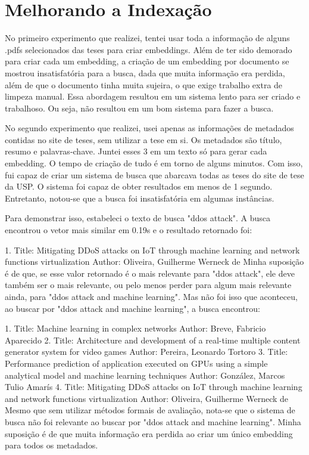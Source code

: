 \documentclass[
	12pt,				%
	openright,			%
	oneside,			%
	a4paper,			%
	english,			%
	french,				%
	spanish,			%
	brazil				%
	]{abntex2}
\begin{document}
\section{Melhorando a Indexação}
No primeiro experimento que realizei, tentei usar toda a informação de alguns .pdfs selecionados das teses para criar
embeddings.
Além de ter sido demorado para criar cada um embedding, a criação de um embedding por documento se mostrou insatisfatória
para a busca, dada que muita informação era perdida, além de que o documento tinha muita sujeira, o que exige trabalho
extra de limpeza manual.
Essa abordagem resultou em um sistema lento para ser criado e trabalhoso.
Ou seja, não resultou em um bom sistema para fazer a busca.

No segundo experimento que realizei, usei apenas as informações de metadados contidas no site de teses, sem utilizar a tese em si. Os metadados são título, resumo e palavras-chave. Juntei esses 3 em um texto só para gerar cada embedding. O tempo de criação de tudo é em torno de alguns minutos. Com isso, fui capaz de criar um sistema de busca que abarcava todas as teses do site de tese da USP. O sistema foi capaz de obter resultados em menos de 1 segundo. Entretanto, notou-se que a busca foi insatisfatória em algumas instâncias.

Para demonstrar isso, estabeleci o texto de busca "ddos attack". A busca encontrou o vetor mais similar em 0.19s e o resultado retornado foi:

1. Title:  Mitigating DDoS attacks on IoT through machine learning and network functions virtualization
Author:  Oliveira, Guilherme Werneck de
Minha suposição é de que, se esse valor retornado é o mais relevante para "ddos attack", ele deve também ser o mais relevante, ou pelo menos perder para algum mais relevante ainda, para "ddos attack and machine learning". Mas não foi isso que aconteceu, ao buscar por "ddos attack and machine learning", a busca encontrou:

1. Title:  Machine learning in complex networks
Author:  Breve, Fabricio Aparecido
2. Title:  Architecture and development of a real-time multiple content generator system for video games
Author:  Pereira, Leonardo Tortoro
3. Title:  Performance prediction of application executed on GPUs using a simple analytical model and machine learning techniques
Author:  González, Marcos Tulio Amarís
4. Title:  Mitigating DDoS attacks on IoT through machine learning and network functions virtualization
Author:  Oliveira, Guilherme Werneck de
Mesmo que sem utilizar métodos formais de avaliação, nota-se que o sistema de busca não foi relevante ao buscar por "ddos attack and machine learning". Minha suposição é de que muita informação era perdida ao criar um único embedding para todos os metadados.
\end{document}

